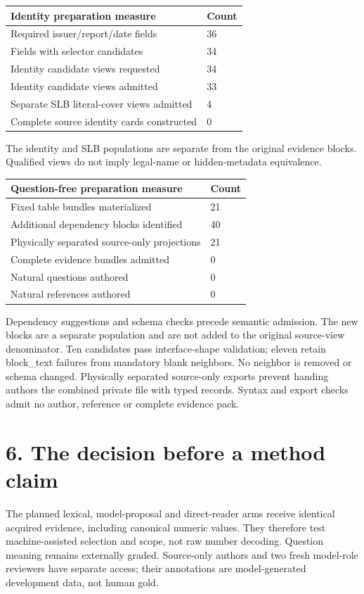 \documentclass[10pt,a4paper]{article}
\begin{document}
\begin{longtable}{@{}p{}p{}@{}}\toprule
\textbf{Identity preparation measure} & \textbf{Count} \\ \midrule\endhead
Required issuer/report/date fields & 36 \\
Fields with selector candidates & 34 \\
Identity candidate views requested & 34 \\
Identity candidate views admitted & 33 \\
Separate SLB literal-cover views admitted & 4 \\
Complete source identity cards constructed & 0 \\
\bottomrule\end{longtable}
{\small The identity and SLB populations are separate from the original evidence blocks. Qualified views do not imply legal-name or hidden-metadata equivalence.}
\begin{longtable}{@{}p{}p{}@{}}\toprule
\textbf{Question-free preparation measure} & \textbf{Count} \\ \midrule\endhead
Fixed table bundles materialized & 21 \\
Additional dependency blocks identified & 40 \\
Physically separated source-only projections & 21 \\
Complete evidence bundles admitted & 0 \\
Natural questions authored & 0 \\
Natural references authored & 0 \\
\bottomrule\end{longtable}
{\small Dependency suggestions and schema checks precede semantic admission. The new blocks are a separate population and are not added to the original source-view denominator.}
Ten candidates pass interface-shape validation; eleven retain block\_text failures from mandatory blank neighbors. No neighbor is removed or schema changed. Physically separated source-only exports prevent handing authors the combined private file with typed records. Syntax and export checks admit no author, reference or complete evidence pack.

\clearpage
\section*{6. The decision before a method claim}
The planned lexical, model-proposal and direct-reader arms receive identical acquired evidence, including canonical numeric values. They therefore test machine-assisted selection and scope, not raw number decoding. Question meaning remains externally graded. Source-only authors and two fresh model-role reviewers have separate access; their annotations are model-generated development data, not human gold.
\end{document}
